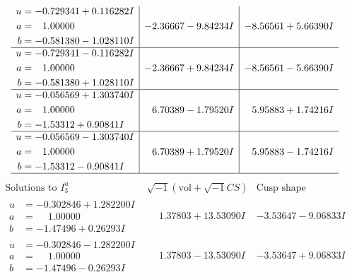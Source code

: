 \documentclass[1p]{elsarticle_modified}
\theoremstyle{definition}
\newcommand{\I}{\sqrt{-1}}
\begin{document}
$$\begin{array}{c|c|c}
\begin{aligned}
u &= -0.729341 + 0.116282 I \\
a &= \phantom{-}1.00000\phantom{ +0.000000I} \\
b &= -0.581380 - 1.028110 I\end{aligned}
 & -2.36667 - 9.84234 I & -8.56561 + 5.66390 I \\ \hline\begin{aligned}
u &= -0.729341 - 0.116282 I \\
a &= \phantom{-}1.00000\phantom{ +0.000000I} \\
b &= -0.581380 + 1.028110 I\end{aligned}
 & -2.36667 + 9.84234 I & -8.56561 - 5.66390 I \\ \hline\begin{aligned}
u &= -0.056569 + 1.303740 I \\
a &= \phantom{-}1.00000\phantom{ +0.000000I} \\
b &= -1.53312 + 0.90841 I\end{aligned}
 & \phantom{-}6.70389 - 1.79520 I & \phantom{-}5.95883 + 1.74216 I \\ \hline\begin{aligned}
u &= -0.056569 - 1.303740 I \\
a &= \phantom{-}1.00000\phantom{ +0.000000I} \\
b &= -1.53312 - 0.90841 I\end{aligned}
 & \phantom{-}6.70389 + 1.79520 I & \phantom{-}5.95883 - 1.74216 I\\
 \hline 
 \end{array}$$\newpage$$\begin{array}{c|c|c}  
\text{Solutions to }I^u_{3}& \I (\text{vol} + \sqrt{-1}CS) & \text{Cusp shape}\\
 \hline 
\begin{aligned}
u &= -0.302846 + 1.282200 I \\
a &= \phantom{-}1.00000\phantom{ +0.000000I} \\
b &= -1.47496 + 0.26293 I\end{aligned}
 & \phantom{-}1.37803 + 13.53090 I & -3.53647 - 9.06833 I \\ \hline\begin{aligned}
u &= -0.302846 - 1.282200 I \\
a &= \phantom{-}1.00000\phantom{ +0.000000I} \\
b &= -1.47496 - 0.26293 I\end{aligned}
 & \phantom{-}1.37803 - 13.53090 I & -3.53647 + 9.06833 I \\ \hline\begin{aligned}

\end{aligned}
\end{array}$$
\end{document}
